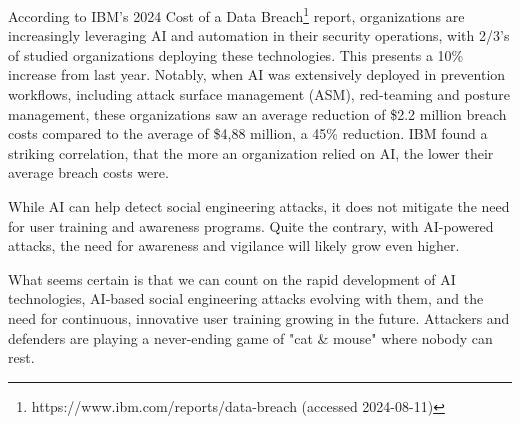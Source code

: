 According to IBM's 2024 Cost of a Data Breach\footnote{https://www.ibm.com/reports/data-breach (accessed 2024-08-11)} report, organizations are increasingly leveraging AI and automation in their security operations, with 2/3's of studied organizations deploying these technologies. This presents a 10\% increase from last year. Notably, when AI was extensively deployed in prevention workflows, including attack surface management (ASM), red-teaming and posture management, these organizations saw an average reduction of \$2.2 million breach costs compared to the average of \$4,88 million, a 45\% reduction. IBM found a striking correlation, that the more an organization relied on AI, the lower their average breach costs were.

While AI can help detect social engineering attacks, it does not mitigate the need for user training and awareness programs. Quite the contrary, with AI-powered attacks, the need for awareness and vigilance will likely grow even higher.

What seems certain is that we can count on the rapid development of AI technologies, AI-based social engineering attacks evolving with them, and the need for continuous, innovative user training growing in the future. Attackers and defenders are playing a never-ending game of "cat \& mouse" where nobody can rest.




